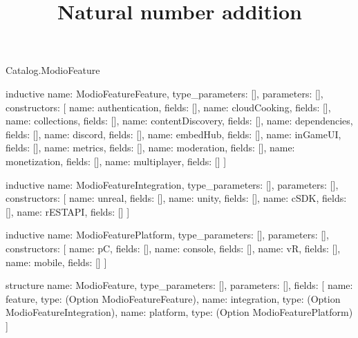 \begin{lexlean}{Catalog.ModioFeature}
\title{Natural number addition}
\begin{semanticmodule}
inductive{
  name: ModioFeatureFeature,
  type_parameters: [],
  parameters: [],
  constructors: [
    {name: authentication, fields: []},
    {name: cloudCooking, fields: []},
    {name: collections, fields: []},
    {name: contentDiscovery, fields: []},
    {name: dependencies, fields: []},
    {name: discord, fields: []},
    {name: embedHub, fields: []},
    {name: inGameUI, fields: []},
    {name: metrics, fields: []},
    {name: moderation, fields: []},
    {name: monetization, fields: []},
    {name: multiplayer, fields: []}
  ]
}

inductive{
  name: ModioFeatureIntegration,
  type_parameters: [],
  parameters: [],
  constructors: [
    {name: unreal, fields: []},
    {name: unity, fields: []},
    {name: cSDK, fields: []},
    {name: rESTAPI, fields: []}
  ]
}

inductive{
  name: ModioFeaturePlatform,
  type_parameters: [],
  parameters: [],
  constructors: [
    {name: pC, fields: []},
    {name: console, fields: []},
    {name: vR, fields: []},
    {name: mobile, fields: []}
  ]
}

structure{
  name: ModioFeature,
  type_parameters: [],
  parameters: [],
  fields: [
    {name: feature, type: (Option ModioFeatureFeature)},
    {name: integration, type: (Option ModioFeatureIntegration)},
    {name: platform, type: (Option ModioFeaturePlatform)}
  ]
}
\end{semanticmodule}
\end{lexlean}
